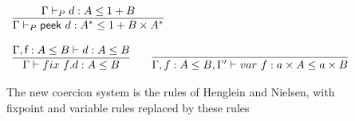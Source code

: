 \documentclass[a4paper,UKenglish,cleveref, autoref, thm-restate]{lipics-v2021}
\begin{document}
\begin{figure}
\caption{The new coercion system is the rules of Henglein and Nielsen, with fixpoint and variable rules replaced by these rules}
\label{fig:system}
\centering
\begin{displaymath}
\begin{array}{lll}



\infer{\containsG{\dslcom{peek}~d}{A^*}{1 + B \times A^*}}{\containsG{d}{A}{1 + B}} \qquad
\\\\
\infer{\contains{\Gamma}{\fix ~f.d}{A}{B}}{ \contains{\Gamma, \dslcom{f}: A \leq B}{d}{A}{B}} \qquad
\infer{\contains{\Gamma, \mathsf{f} : A \leq B, \Gamma'}{var~f}{a \times A}{a \times B}}{}
\end{array}
\end{displaymath}
\end{figure}
\end{document}
